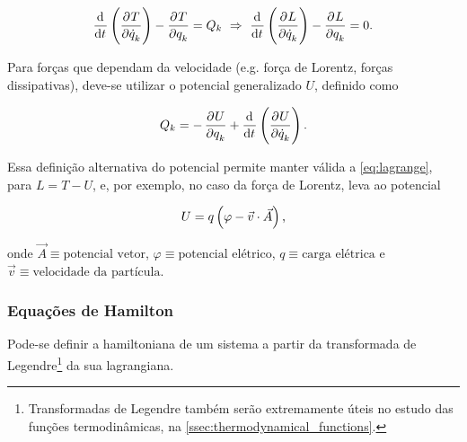 \begin{equation*}
    \dod{}{t} \del{\dpd{T}{\dot q_k}} - \dpd{T}{q_k} = Q_k
    ~\Rightarrow~
    \dod{}{t} \del{\dpd{L}{\dot q_k}} - \dpd{L}{q_k} = 0 \text{.}
\end{equation*}

Para forças que dependam da velocidade (e.g. força de Lorentz, forças
dissipativas), deve-se utilizar o potencial generalizado $U$, definido como

\begin{equation*}
    Q_k = - \dpd{U}{q_k} + \dod{}{t} \del{\dpd{U}{\dot q_k}} \text{.}
\end{equation*}

Essa definição alternativa do potencial permite manter válida a
\autoref{eq:lagrange}, para $L = T - U$, e, por exemplo, no caso da força de
Lorentz, leva ao potencial

\begin{equation*}
    U = q \del{\varphi - {\vec v} \cdot {\vec A}} \text{,}
\end{equation*}

onde $\vec A \equiv \text{potencial vetor}$, $\varphi \equiv \text{potencial
elétrico}$, $q \equiv \text{carga elétrica}$ e $\vec v \equiv \text{velocidade
da partícula}$.

\subsubsection{Equações de Hamilton}
\label{sssec:hamilton}

Pode-se definir a hamiltoniana de um sistema a partir da transformada de
Legendre\footnote{Transformadas de Legendre também serão extremamente úteis no
estudo das funções termodinâmicas, na \autoref{ssec:thermodynamical_functions}.}
da sua lagrangiana.


